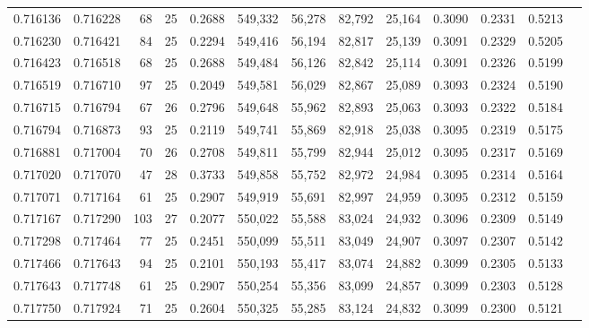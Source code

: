 \begin{tabular}{rrrrrrrrrrrrr}
0.716136 & 0.716228 &    68 &  25 &                                     0.2688 & 549,332 &  56,278 &  82,792 &  25,164 & 0.3090 & 0.2331 & 0.5213 \\
0.716230 & 0.716421 &    84 &  25 &                                     0.2294 & 549,416 &  56,194 &  82,817 &  25,139 & 0.3091 & 0.2329 & 0.5205 \\
0.716423 & 0.716518 &    68 &  25 &                                     0.2688 & 549,484 &  56,126 &  82,842 &  25,114 & 0.3091 & 0.2326 & 0.5199 \\
0.716519 & 0.716710 &    97 &  25 &                                     0.2049 & 549,581 &  56,029 &  82,867 &  25,089 & 0.3093 & 0.2324 & 0.5190 \\
0.716715 & 0.716794 &    67 &  26 &                                     0.2796 & 549,648 &  55,962 &  82,893 &  25,063 & 0.3093 & 0.2322 & 0.5184 \\
0.716794 & 0.716873 &    93 &  25 &                                     0.2119 & 549,741 &  55,869 &  82,918 &  25,038 & 0.3095 & 0.2319 & 0.5175 \\
0.716881 & 0.717004 &    70 &  26 &                                     0.2708 & 549,811 &  55,799 &  82,944 &  25,012 & 0.3095 & 0.2317 & 0.5169 \\
0.717020 & 0.717070 &    47 &  28 &                                     0.3733 & 549,858 &  55,752 &  82,972 &  24,984 & 0.3095 & 0.2314 & 0.5164 \\
0.717071 & 0.717164 &    61 &  25 &                                     0.2907 & 549,919 &  55,691 &  82,997 &  24,959 & 0.3095 & 0.2312 & 0.5159 \\
0.717167 & 0.717290 &   103 &  27 &                                     0.2077 & 550,022 &  55,588 &  83,024 &  24,932 & 0.3096 & 0.2309 & 0.5149 \\
0.717298 & 0.717464 &    77 &  25 &                                     0.2451 & 550,099 &  55,511 &  83,049 &  24,907 & 0.3097 & 0.2307 & 0.5142 \\
0.717466 & 0.717643 &    94 &  25 &                                     0.2101 & 550,193 &  55,417 &  83,074 &  24,882 & 0.3099 & 0.2305 & 0.5133 \\
0.717643 & 0.717748 &    61 &  25 &                                     0.2907 & 550,254 &  55,356 &  83,099 &  24,857 & 0.3099 & 0.2303 & 0.5128 \\
0.717750 & 0.717924 &    71 &  25 &                                     0.2604 & 550,325 &  55,285 &  83,124 &  24,832 & 0.3099 & 0.2300 & 0.5121 \\

\end{tabular}
